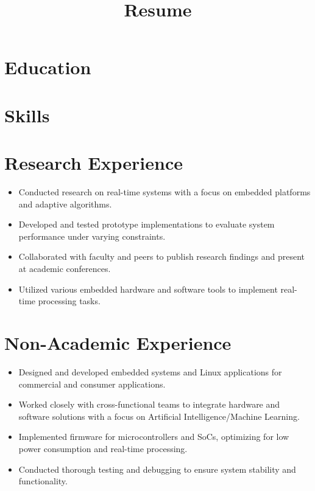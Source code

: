 \documentclass[letterpaper]{moderncv}
\title{Resume}
\begin{document}
	\makecvtitle

	\section{Education}

  \section{Skills}

	\section{Research Experience}
    \begin{itemize}
    \item Conducted research on real-time systems with a focus on embedded platforms and adaptive algorithms.
    \item Developed and tested prototype implementations to evaluate system performance under varying constraints.
    \item Collaborated with faculty and peers to publish research findings and present at academic conferences.
    \item Utilized various embedded hardware and software tools to implement real-time processing tasks.
    \end{itemize}

  \section{Non-Academic Experience}
    \begin{itemize}
    \item Designed and developed embedded systems and Linux applications for commercial and consumer applications.
    \item Worked closely with cross-functional teams to integrate hardware and software solutions with a focus on Artificial Intelligence/Machine Learning.
    \item Implemented firmware for microcontrollers and SoCs, optimizing for low power consumption and real-time processing.
    \item Conducted thorough testing and debugging to ensure system stability and functionality.
    \end{itemize}
\end{document}
